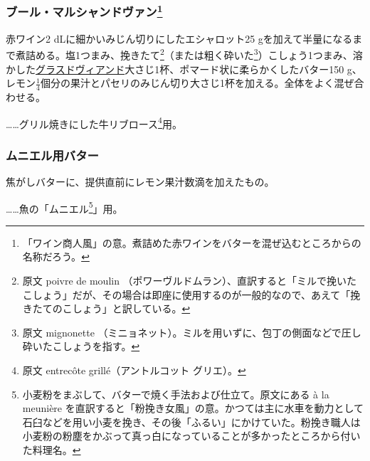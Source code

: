 \begin{recette}
\hypertarget{beurre-marchand-de-vin}{%
\subsubsection[ブール・マルシャンドヴァン]{\texorpdfstring{ブール・マルシャンドヴァン\footnote{「ワイン商人風」の意。煮詰めた赤ワインをバターを混ぜ込むところからの名称だろう。}}{ブール・マルシャンドヴァン}}\label{beurre-marchand-de-vin}}



赤ワイン2 dLに細かいみじん切りにしたエシャロット25
gを加えて半量になるまで煮詰める。塩1つまみ、挽きたて\footnote{原文
  poivre de moulin
  （ポワーヴルドムラン）、直訳すると「ミルで挽いたこしょう」だが、その場合は即座に使用するのが一般的なので、あえて「挽きたてのこしょう」と訳している。}（または粗く砕いた\footnote{原文
  mignonette
  （ミニョネット）。ミルを用いずに、包丁の側面などで圧し砕いたこしょうを指す。}）こしょう1つまみ、溶かした\protect\hyperlink{glace-de-viande}{グラスドヴィアンド}大さじ1杯、ポマード状に柔らかくしたバター150
g、レモン\(\frac{1}{4}\)個分の果汁とパセリのみじん切り大さじ1杯を加える。全体をよく混ぜ合わせる。

\ldots{}\ldots{}グリル焼きにした牛リブロース\footnote{原文 entrecôte
  grillé（アントルコット グリエ）。}用。

\hypertarget{beurre-a-la-meuniere}{%
\subsubsection{ムニエル用バター}\label{beurre-a-la-meuniere}}



焦がしバターに、提供直前にレモン果汁数滴を加えたもの。

\ldots{}\ldots{}魚の「ムニエル\footnote{小麦粉をまぶして、バターで焼く手法および仕立て。原文にある
  à la meunière
  を直訳すると「粉挽き女風」の意。かつては主に水車を動力として石臼などを用い小麦を挽き、その後「ふるい」にかけていた。粉挽き職人は小麦粉の粉塵をかぶって真っ白になっていることが多かったところから付いた料理名。}」用。


\end{recette}
